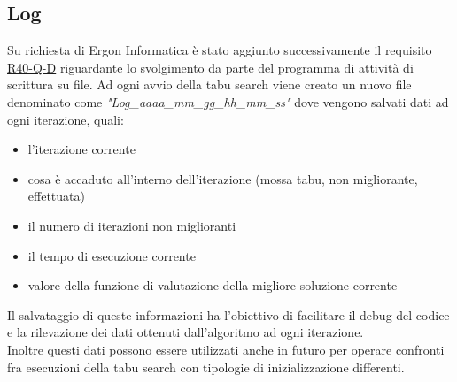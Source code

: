 \subsection{Log}
\label{sec:log}
\noindent Su richiesta di Ergon Informatica è stato aggiunto successivamente il requisito \hyperref[tab:requisiti-qualitativi]{R40-Q-D}
riguardante lo svolgimento da parte del programma di attività di scrittura
su file. Ad ogni avvio della tabu search viene creato un nuovo
file denominato come \textit{"Log\_aaaa\_mm\_gg\_hh\_mm\_ss"}
dove vengono salvati dati ad ogni iterazione, quali:
\begin{itemize}
    \item l'iterazione corrente
    \item cosa è accaduto all'interno dell'iterazione (mossa tabu, non migliorante, effettuata)
    \item il numero di iterazioni non miglioranti
    \item il tempo di esecuzione corrente
    \item valore della funzione di valutazione della migliore soluzione corrente
\end{itemize}
Il salvataggio di queste informazioni ha
l’obiettivo di facilitare il debug
del codice e la rilevazione dei dati ottenuti
dall’algoritmo ad ogni iterazione.\\
Inoltre questi dati possono essere utilizzati anche in futuro
per operare confronti fra esecuzioni della tabu search con
tipologie di inizializzazione differenti.

\newpage

